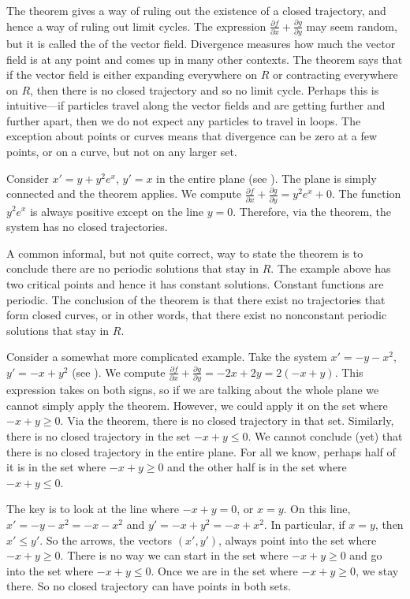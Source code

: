 The theorem gives a way of ruling out the existence of a closed
trajectory, and hence a
way of ruling out limit cycles.
The expression
$\frac{\partial f}{\partial x} + \frac{\partial g}{\partial y}$
may seem random,
but it is called the \emph{} of the
vector field.
Divergence measures how much the vector field is
 at any point and comes up
in many other contexts.
The theorem says that if the vector field is
either expanding everywhere on $R$
or contracting everywhere on $R$, then
there is no closed trajectory and so no limit cycle.
Perhaps this is intuitive---if particles travel along the vector
fields and are getting further and further apart, then we
do not expect any particles to travel in loops.
The exception about points or curves 
means that divergence can be zero at a few points,
or on a curve, but not on any larger set.

\begin{example}
Consider $x'=y+y^2e^x$, $y'=x$ in the entire plane (see
).
The plane
is simply connected and the theorem applies.  We compute
$\frac{\partial f}{\partial x} + \frac{\partial g}{\partial y} =
y^2e^x+ 0$.  The function $y^2e^x$ is always positive except on the line
$y=0$.  Therefore, via the theorem, the system has no closed trajectories.
\end{example}

A common informal, but not quite correct, way to state
the theorem is to
conclude there are no periodic solutions that stay in $R$.
The example above has two critical points and hence it has
constant solutions.  Constant functions are periodic.
The conclusion of
the theorem is that there exist no trajectories that form closed
curves, or in other words,
that there exist no nonconstant periodic solutions
that stay in $R$.

\begin{example}
Consider a somewhat more complicated example.
Take the system $x'=-y-x^2$, $y'=-x+y^2$ (see
).  We compute
$\frac{\partial f}{\partial x} + \frac{\partial g}{\partial y} =
-2x + 2y=2(-x+y)$.  This expression takes on both signs, so if we are talking about the
whole plane we cannot simply apply the theorem.  However, we could apply it
on the set where $-x+y \geq 0$.  Via the theorem, there is no
closed trajectory in that set.  Similarly, there is no closed trajectory
in the set $-x+y \leq 0$.  We cannot conclude (yet) that there is no closed
trajectory in the entire plane.  For all we know, perhaps half of it is in the set where
$-x+y \geq 0$ and the other half is in the set where $-x+y \leq 0$.

The key is to look at the line where $-x+y=0$, or $x=y$.
On this line,
$x' = -y-x^2 = -x-x^2$ and $y' = -x+y^2 = -x+x^2$.
In particular,
if $x=y$, then $x' \leq y'$.  So the arrows, the vectors
$(x',y')$, always point
into the set where $-x+y \geq 0$.  There is no way we can start in the
set where $-x+y \geq 0$
and go into the set where $-x+y \leq 0$.  Once we are in
the set where $-x+y \geq 0$, we stay there.  So no closed trajectory can
have points in both sets.
\end{example}

